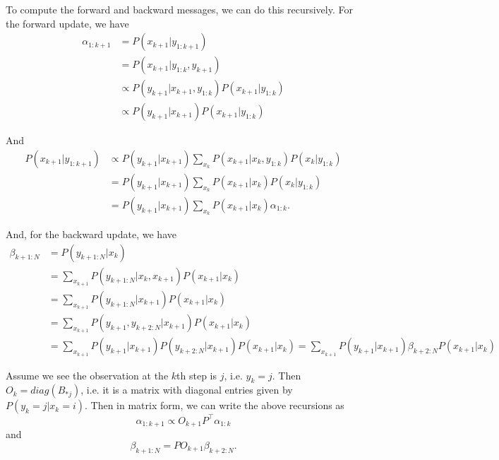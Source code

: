 \documentclass[english]{article}
\numberwithin{equation}{section}
\DeclarePairedDelimiter\paren{(}{)}           %
\begin{document}
	To compute the forward and backward messages, we can do this recursively. For the forward update, we have
	\begin{align*}
	\alpha_{1:k+1} &=P(x_{k+1}|y_{1:k+1}) \\
	&=P(x_{k+1}|y_{1:k},y_{k+1}) \\
	&\propto P(y_{k+1}|x_{k+1},y_{1:k})P(x_{k+1}|y_{1:k}) \\
	&\propto P(y_{k+1}|x_{k+1}) P(x_{k+1}|y_{1:k}) 
	\end{align*}
	
	And \begin{align*}
	P(x_{k+1}|y_{1:k+1}) &\propto P(y_{k+1}|x_{k+1})\sum_{x_k} P(x_{k+1}|x_k,y_{1:k})P(x_k|y_{1:k}) \\
	&= P(y_{k+1}|x_{k+1})\sum_{x_k} P(x_{k+1}|x_k)P(x_k|y_{1:k}) \\
	&= P(y_{k+1}|x_{k+1})\sum_{x_k} P(x_{k+1}|x_k)\alpha_{1:k}.
	\end{align*}
	
	And, for the backward update, we have
	\begin{align*}
	\beta_{k+1:N} &=P(y_{k+1:N}|x_k) \\
	&=\sum_{x_{k+1}}P(y_{k+1:N}|x_k,x_{k+1})P(x_{k+1}|x_k) \\
	&= \sum_{x_{k+1}}P(y_{k+1:N}|x_{k+1})P(x_{k+1}|x_k) \\
	&= \sum_{x_{k+1}}P(y_{k+1},y_{k+2:N}|x_{k+1})P(x_{k+1}|x_k) \\
	&= \sum_{x_{k+1}}P(y_{k+1}|x_{k+1})P(y_{k+2:N}|x_{k+1})P(x_{k+1}|x_k) = \sum_{x_{k+1}} P(y_{k+1}|x_{k+1})\beta_{k+2:N}P(x_{k+1}|x_k)
	\end{align*}
	
	Assume we see the observation at the $k$th step is $j$, i.e. $y_k=j$. Then $O_{k} = diag(B_{*j})$, i.e. it is a matrix with diagonal entries given by $P(y_k=j|x_k=i)$. Then in matrix form, we can write the above recursions as
	$$\alpha_{1:k+1} \propto O_{k+1}P^{\top} \alpha_{1:k}$$
	and
	$$\beta_{k+1:N}=PO_{k+1}\beta_{k+2:N}.$$
	
%	
%	
%	
%	
	
\end{document}
